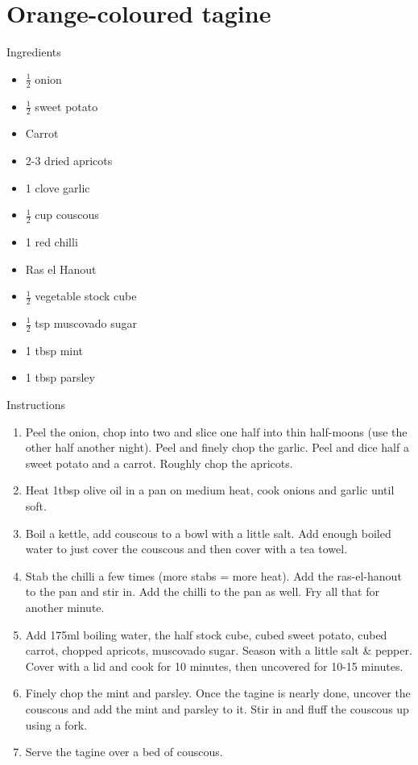 \documentclass[../dinner.tex]{subfiles}
\begin{document}
	\pagestyle{fancy}
	\fancyhf{}
	\newpage
	\section{Orange-coloured tagine}
	\lhead{}
	{\Large Ingredients}
	\begin{multicols}{2}
		\begin{itemize}
			\item \(\frac{1}{2}\) onion
			\item \(\frac{1}{2}\) sweet potato
			\item Carrot
			\item 2-3 dried apricots
			\item 1 clove garlic
			\item \(\frac{1}{2}\) cup couscous
		\end{itemize}
		\columnbreak
		\begin{itemize}
			\item 1 red chilli
			\item Ras el Hanout
			\item \(\frac{1}{2}\) vegetable stock cube
			\item \(\frac{1}{2}\) tsp muscovado sugar
			\item 1 tbsp mint
			\item 1 tbsp parsley
		\end{itemize}
	\end{multicols}

	{\Large Instructions}
	\begin{enumerate}
		\item Peel the onion, chop into two and slice one half into thin half-moons (use the other half another night). Peel and finely chop the garlic. Peel and dice half a sweet potato and a carrot. Roughly chop the apricots.
		\item Heat 1tbsp olive oil in a pan on medium heat, cook onions and garlic until soft.
		\item Boil a kettle, add couscous to a bowl with a little salt. Add enough boiled water to just cover the couscous and then cover with a tea towel.
		\item Stab the chilli a few times (more stabs = more heat). Add the ras-el-hanout to the pan and stir in. Add the chilli to the pan as well. Fry all that for another minute.
		\item Add 175ml boiling water, the half stock cube, cubed sweet potato, cubed carrot, chopped apricots, muscovado sugar. Season with a little salt \& pepper.\\
		Cover with a lid and cook for 10 minutes, then uncovered for 10-15 minutes.
		\item Finely chop the mint and parsley. Once the tagine is nearly done, uncover the couscous and add the mint and parsley to it. Stir in and fluff the couscous up using a fork.
		\item Serve the tagine over a bed of couscous.
	\end{enumerate}
\end{document}
